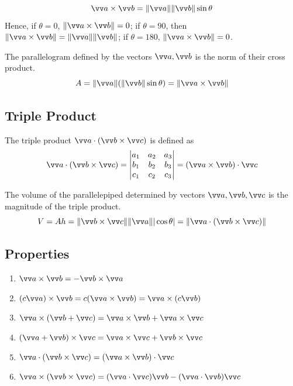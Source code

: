 \begin{theorem}
$$
\vv a \times \vv b = \norm{\vv a}\norm{\vv b}\sin\theta
$$
Hence, if $\theta=0$, $\norm{\vv a \times \vv b} = 0$; if $\theta=90$, then $\norm{\vv a \times \vv b}=\norm{\vv a}\norm{\vv b}$; if $\theta=180$, $\norm{\vv a \times \vv b} = 0$.
\end{theorem}

\begin{theorem}
The parallelogram defined by the vectors $\vv a, \vv b$ is the norm of their cross product.
$$
A = \norm{\vv a}(\norm{\vv b}\sin\theta) = \norm{\vv a \times \vv b}
$$
\end{theorem}

\subsection{Triple Product}

\begin{definition}
The triple product $\vv a \cdot (\vv b \times \vv c)$ is defined as
$$
\vv a \cdot (\vv b \times \vv c) = \begin{vmatrix}
a_1 & a_2 & a_3 \\
b_1 & b_2 & b_3 \\
c_1 & c_2 & c_3
\end{vmatrix} = (\vv a \times \vv b) \cdot \vv c
$$
\end{definition}

\begin{theorem}
The volume of the parallelepiped determined by vectors $\vv a,\vv b,\vv c$ is the magnitude of the triple product.
$$
V=Ah=\norm{\vv b \times \vv c}\norm{\vv a}|\cos\theta|=\norm{\vv a \cdot (\vv b \times \vv c)}
$$
\end{theorem}

\subsection{Properties}

\begin{multicols}{2}
\begin{enumerate}
    \item $\vv a \times \vv b = - \vv b \times \vv a$
    \item $(c\vv a) \times \vv b = c(\vv a \times \vv b) = \vv a \times (c \vv b)$
    \item $\vv a \times (\vv b + \vv c) = \vv a \times \vv b + \vv a \times \vv c$
    \item $(\vv a + \vv b) \times \vv c = \vv a \times \vv c + \vv b \times \vv c$
    \item $\vv a \cdot (\vv b \times \vv c) = (\vv a \times \vv b) \cdot \vv c$
    \item $\vv a \times (\vv b \times \vv c) = (\vv a \cdot \vv c)\vv b - (\vv a \cdot \vv b)\vv c$
\end{enumerate}
\end{multicols}
